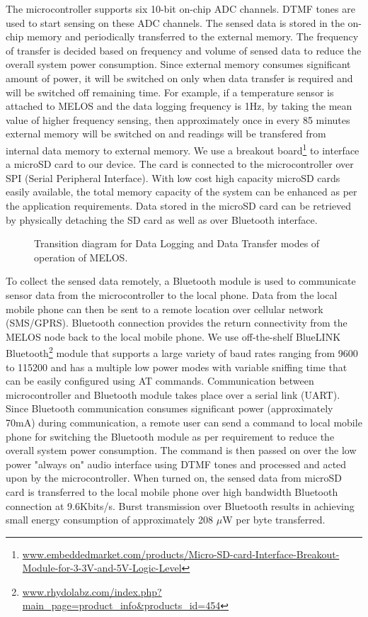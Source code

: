 \documentclass[10pt]{sigplan-proc-varsize}
\newcommand{\melos}{MELOS }
\newcommand{\melosnospace}{MELOS}
\begin{document}
The microcontroller supports six 10-bit on-chip ADC channels. DTMF tones are used to start sensing on these ADC channels. The sensed data is stored in the on-chip memory and periodically transferred to the external memory. The frequency of transfer is decided based on frequency and volume of sensed data to reduce the overall system power consumption. Since external memory consumes significant amount of power, it will be switched on only when data transfer is required and will be switched off remaining time. For example, if a temperature sensor is attached to \melos and the data logging frequency is 1Hz, by taking the mean value of higher frequency sensing, then approximately once in every 85 minutes external memory will be switched on and readings will be transfered from internal data memory to external memory.  We use a breakout board\footnote{\url{www.embeddedmarket.com/products/Micro-SD-card-Interface-Breakout-Module-for-3-3V-and-5V-Logic-Level}} to interface a microSD card to our device. The card is connected to the microcontroller over SPI (Serial Peripheral Interface). With low cost high capacity microSD cards easily available, the total memory capacity of the system can be enhanced as per the application requirements. Data stored in the microSD card can be retrieved by physically detaching the SD card as well as over Bluetooth interface. 

\begin{figure}
\centering
{}
\caption{Transition diagram for Data Logging and Data Transfer modes of operation of \melosnospace.}
\label{fig:statetransition}
\vspace{-5mm}
\end{figure}


To collect the sensed data remotely, a Bluetooth module is used to communicate sensor data from the microcontroller to the local phone. Data from the local mobile phone can then be sent to a remote location over cellular network (SMS/GPRS). Bluetooth connection provides the return connectivity from the \melos node back to the local mobile phone. We use off-the-shelf BlueLINK Bluetooth\footnote{\url{www.rhydolabz.com/index.php?main_page=product_info&products_id=454}} module that supports a large variety of baud rates ranging from 9600 to 115200 and has a multiple low power modes with variable sniffing time that can be easily configured using AT commands. Communication between microcontroller and Bluetooth module takes place over a serial link (UART). Since Bluetooth communication consumes significant power (approximately 70mA) during communication, a remote user can send a command to local mobile phone for switching the Bluetooth module as per requirement to reduce the overall system power consumption. The command is then passed on over the low power "always on" audio interface using DTMF tones and processed and acted upon by the microcontroller. When turned on, the sensed data from microSD card is transferred to the local mobile phone over high bandwidth Bluetooth connection at 9.6Kbits/s. Burst transmission over Bluetooth results in achieving small energy consumption of approximately 208 $\mu$W per byte transferred.
\end{document}
